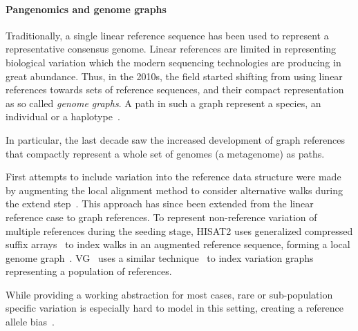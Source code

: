 \paragraph{Pangenomics and genome graphs}
Traditionally, a single linear reference sequence has been used to represent a
representative consensus genome. Linear references are limited in representing
biological variation which the modern sequencing technologies are producing in
great abundance. Thus, in the 2010s, the field started shifting from using
linear references towards sets of reference sequences, and their compact
representation as so called \emph{genome graphs}. A path in such a graph
represent a species, an individual or a
haplotype~\cite{dilthey_improved_2015,paten_genome_2017}.

In particular, the last decade saw the increased development of graph references
that compactly represent a whole set of genomes (a metagenome) as paths.

First attempts to include variation into the reference data structure were made
by augmenting the local alignment method to consider alternative walks during the
extend step~\cite{schneeberger_simultaneous_2009,palmapper}. This approach has
since been extended from the linear reference case to graph references. To
represent non-reference variation of multiple references during the seeding
stage, HISAT2 uses generalized compressed suffix
arrays~\cite{siren_indexing_2014} to index walks in an augmented reference
sequence, forming a local genome graph~\cite{kim_graphbased_2019}.
VG~\cite{garrison_variation_2018} uses a similar
technique~\cite{siren_indexing_2017} to index variation graphs representing a
population of references.

While providing a working abstraction for most cases, rare or sub-population
specific variation is especially hard to model in this setting, creating a
reference allele bias~\cite{stevenson_sources_2013,brandt_mapping_2015}.

